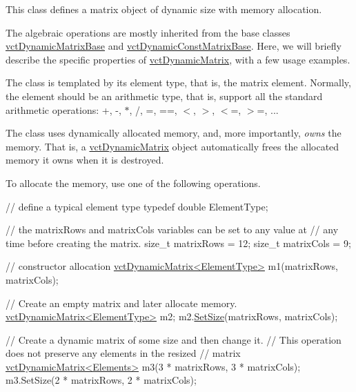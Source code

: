 This class defines a matrix object of dynamic size with memory allocation.

The algebraic operations are mostly inherited from the base classes \hyperlink{classvct_dynamic_matrix_base}{vct\-Dynamic\-Matrix\-Base} and \hyperlink{classvct_dynamic_const_matrix_base}{vct\-Dynamic\-Const\-Matrix\-Base}. Here, we will briefly describe the specific properties of \hyperlink{classvct_dynamic_matrix}{vct\-Dynamic\-Matrix}, with a few usage examples.


\begin{DoxyEnumerate}
\item The class is templated by its element type, that is, the matrix element. Normally, the element should be an arithmetic type, that is, support all the standard arithmetic operations\-: +, -\/, $\ast$, /, =, ==, $<$, $>$, $<$=, $>$=, ... 
\item The class uses dynamically allocated memory, and, more importantly, {\itshape owns} the memory. That is, a \hyperlink{classvct_dynamic_matrix}{vct\-Dynamic\-Matrix} object automatically frees the allocated memory it owns when it is destroyed. 
\item To allocate the memory, use one of the following operations. 
\begin{DoxyCode}
\textcolor{comment}{// define a typical element type}
\textcolor{keyword}{typedef} \textcolor{keywordtype}{double} ElementType;

\textcolor{comment}{// the matrixRows and matrixCols variables can be set to any value at}
\textcolor{comment}{// any time before creating the matrix.}
\textcolor{keywordtype}{size\_t} matrixRows = 12;
\textcolor{keywordtype}{size\_t} matrixCols = 9;

\textcolor{comment}{// constructor allocation}
\hyperlink{classvct_dynamic_matrix}{vctDynamicMatrix<ElementType>} m1(matrixRows, matrixCols);

\textcolor{comment}{// Create an empty matrix and later allocate memory.}
\hyperlink{classvct_dynamic_matrix}{vctDynamicMatrix<ElementType>} m2;
m2.\hyperlink{classvct_dynamic_matrix_a4ff773e41fa6605e6e2527822b1ae662}{SetSize}(matrixRows, matrixCols);

\textcolor{comment}{// Create a dynamic matrix of some size and then change it.}
\textcolor{comment}{// This operation does not preserve any elements in the resized}
\textcolor{comment}{// matrix}
\hyperlink{classvct_dynamic_matrix}{vctDynamicMatrix<Elements>} m3(3 * matrixRows, 3 * matrixCols);
m3.SetSize(2 * matrixRows, 2 * matrixCols);


\end{DoxyCode}
\end{DoxyEnumerate}
